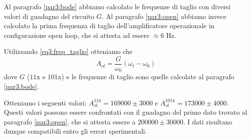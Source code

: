 Al paragrafo \ref{par3:bode} abbiamo calcolato le frequenze di taglio con diversi valori di guadagno del circuito $G$. Al paragrafo \ref{par3:open} abbiamo invece calcolato la prima frequenza di taglio dell'amplificatore operazionale in configurazione open loop, che si attesta ad essere $\approx 6$ \si{\hertz}.

Utilizzando \ref{eq3:freq_taglio} otteniamo che
$$A_{ol} = \frac{G}{\omega_0} (\omega_t - \omega_0)$$
dove $G$ ($11\mathrm{x}$ e $101\mathrm{x}$) e le frequenze di taglio sono quelle calcolate al paragrafo \ref{par3:bode}.

Otteniamo i seguenti valori: $A_{ol}^{11\mathrm{x}} = 169000 \pm 3000$ e $A_{ol}^{101\mathrm{x}} = 173000 \pm 4000$. Questi valori possono essere confrontati con il guadagno del primo dato trovato al paragrafo \ref{par3:open}, che si attesta essere a $200000 \pm 30000$. I dati risultano dunque compatibili entro gli errori sperimentali.